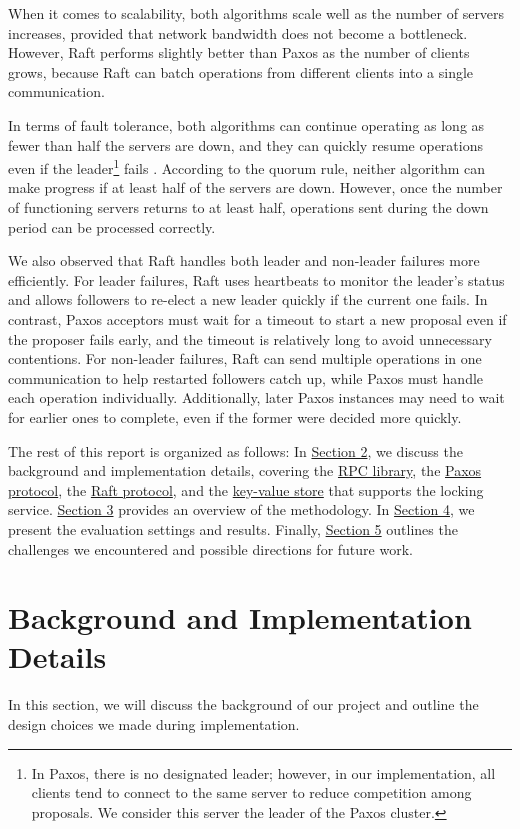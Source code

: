 \documentclass[11pt,a4paper]{article}
\begin{document}
When it comes to scalability, both algorithms scale well as the number of servers increases, provided that network bandwidth does not become a bottleneck. However, Raft performs slightly better than Paxos as the number of clients grows, because Raft can batch operations from different clients into a single communication.

In terms of fault tolerance, both algorithms can continue operating as long as fewer than half the servers are down, and they can quickly resume operations even if the leader\footnote{In Paxos, there is no designated leader; however, in our implementation, all clients tend to connect to the same server to reduce competition among proposals. We consider this server the leader of the Paxos cluster.} fails . According to the quorum rule, neither algorithm can make progress if at least half of the servers are down. However, once the number of functioning servers returns to at least half, operations sent during the down period can be processed correctly.

We also observed that Raft handles both leader and non-leader failures more efficiently. For leader failures, Raft uses heartbeats to monitor the leader's status and allows followers to re-elect a new leader quickly if the current one fails. In contrast, Paxos acceptors must wait for a timeout to start a new proposal even if the proposer fails early, and the timeout is relatively long to avoid unnecessary contentions. For non-leader failures, Raft can send multiple operations in one communication to help restarted followers catch up, while Paxos must handle each operation individually. Additionally, later Paxos instances may need to wait for earlier ones to complete, even if the former were decided more quickly.

The rest of this report is organized as follows: In \hyperref[sec2]{Section 2}, we discuss the background and implementation details, covering the \hyperref[subsecRPC]{RPC library}, the \hyperref[subsecPaxos]{Paxos protocol}, the \hyperref[subsecRaft]{Raft protocol}, and the \hyperref[subsecKV]{key-value store} that supports the locking service. \hyperref[sec3]{Section 3} provides an overview of the methodology. In \hyperref[sec4]{Section 4}, we present the evaluation settings and results. Finally, \hyperref[sec5]{Section 5} outlines the challenges we encountered and possible directions for future work.

\section{Background and Implementation Details}\label{sec2}
In this section, we will discuss the background of our project and outline the design choices we made during implementation.
\end{document}
